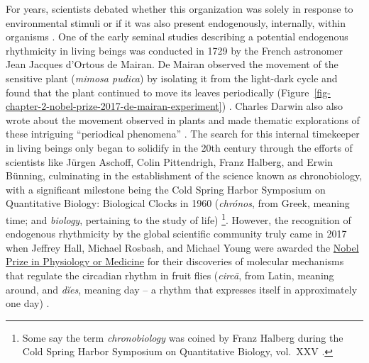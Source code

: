 \documentclass[
12pt,
openright,
oneside,
a4paper,
chapter=TITLE,
section=TITLE,
french,
spanish,
brazil,
english
]{abntex2}\usepackage{array}
\begin{document}
For years, scientists debated whether this organization was solely in
response to environmental stimuli or if it was also present
endogenously, internally, within organisms \autocite{rotenberg2003}. One
of the early seminal studies describing a potential endogenous
rhythmicity in living beings was conducted in 1729 by the French
astronomer Jean Jacques d'Ortous de Mairan. De Mairan observed the
movement of the sensitive plant (\emph{mimosa pudica}) by isolating it
from the light-dark cycle and found that the plant continued to move its
leaves periodically
(Figure~\ref{fig-chapter-2-nobel-prize-2017-de-mairan-experiment})
\autocite{demairan1729,rotenberg2003}. Charles Darwin also also wrote
about the movement observed in plants and made thematic explorations of
these intriguing ``periodical phenomena'' \autocite{andrade2024}. The
search for this internal timekeeper in living beings only began to
solidify in the 20th century through the efforts of scientists like
Jürgen Aschoff, Colin Pittendrigh, Franz Halberg, and Erwin Bünning,
culminating in the establishment of the science known as chronobiology,
with a significant milestone being the Cold Spring Harbor Symposium on
Quantitative Biology: Biological Clocks in 1960 (\emph{chrónos}, from
Greek, meaning time; and \emph{biology}, pertaining to the study of
life) \autocite{rotenberg2003,coldspringharborlaboratory}\footnote{Some
  say the term \emph{chronobiology} was coined by Franz Halberg during
  the Cold Spring Harbor Symposium on Quantitative Biology, vol.~XXV
  \autocite[21]{menna-barreto2023}.}. However, the recognition of
endogenous rhythmicity by the global scientific community truly came in
2017 when Jeffrey Hall, Michael Rosbash, and Michael Young were awarded
the
\href{https://www.nobelprize.org/prizes/medicine/2017/press-release/}{Nobel
Prize in Physiology or Medicine} for their discoveries of molecular
mechanisms that regulate the circadian rhythm in fruit flies
(\emph{circā}, from Latin, meaning around, and \emph{dĭes}, meaning day
\autocite{latinitium} -- a rhythm that expresses itself in approximately
one day) \autocite{nobelprizeoutreachab}.
\end{document}
